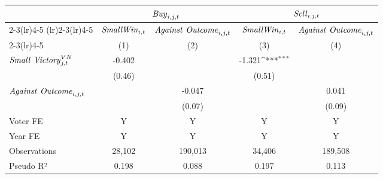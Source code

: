 {
\def\sym#1{\ifmmode^{#1}\else\(^{#1}\)\fi}
\begin{tabular}{l*{4}{c}}
\toprule
                    &\multicolumn{2}{c}{${\it Buy}_{i,j,t}$}    &\multicolumn{2}{c}{${\it Sell}_{i,j,t}$}   \\\cmidrule(lr){2-3}\cmidrule(lr){4-5}
\cmidrule(lr){2-3}\cmidrule(lr){4-5} & \multicolumn{1}{c}{${\it Small Win}_{i,t}$} & \multicolumn{1}{c}{${\it Against\ Outcome}_{i,j,t}$} & \multicolumn{1}{c}{${\it Small Win}_{i,t}$} & \multicolumn{1}{c}{${\it Against\ Outcome}_{i,j,t}$} \\ \cmidrule(lr){2-3}\cmidrule(lr){4-5} & \multicolumn{1}{c}{(1)} & \multicolumn{1}{c}{(2)} & \multicolumn{1}{c}{(3)} & \multicolumn{1}{c}{(4)} \\ \midrule
${\it Small\ Victory}^{VN}_{j,t}$&      -0.402         &                     &      -1.321\sym{***}&                     \\
                    &      (0.46)         &                     &      (0.51)         &                     \\
${\it Against\ Outcome}_{i,j,t}$&                     &      -0.047         &                     &       0.041         \\
                    &                     &      (0.07)         &                     &      (0.09)         \\
\midrule
Voter FE            &           Y         &           Y         &           Y         &           Y         \\
Year FE             &           Y         &           Y         &           Y         &           Y         \\
Observations        &      28,102         &     190,013         &      34,406         &     189,508         \\
Pseudo R²           &       0.198         &       0.088         &       0.197         &       0.113         \\
\bottomrule
\end{tabular}
}
